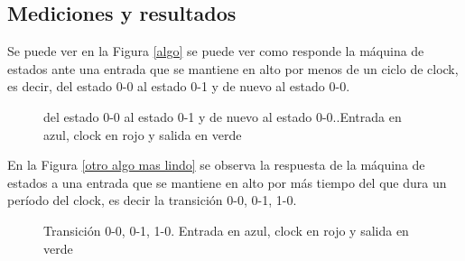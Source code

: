 \subsection{Mediciones y resultados}
Se puede ver en la Figura \ref{algo} se puede ver como responde la m\'aquina de estados ante una entrada que se mantiene en alto por menos de un ciclo de clock, es decir, del estado 0-0 al estado 0-1 y de nuevo al estado 0-0.

\begin{figure}[H]
    \centering
    \caption{del estado 0-0 al estado 0-1 y de nuevo al estado 0-0..Entrada en azul, clock en rojo y salida en verde}
    \label{fig:LEVEL_SHIFTER}
\end{figure}

En la Figura \ref{otro algo mas lindo} se observa la respuesta de la m\'aquina de estados a una entrada que se mantiene en alto por m\'as tiempo del que dura un per\'iodo del clock, es decir la transici\'on 0-0, 0-1, 1-0.
\begin{figure}[H]
    \centering
    \caption{Transici\'on 0-0, 0-1, 1-0. Entrada en azul, clock en rojo y salida en verde}
    \label{fig:LEVEL_SHIFTER}
\end{figure}

